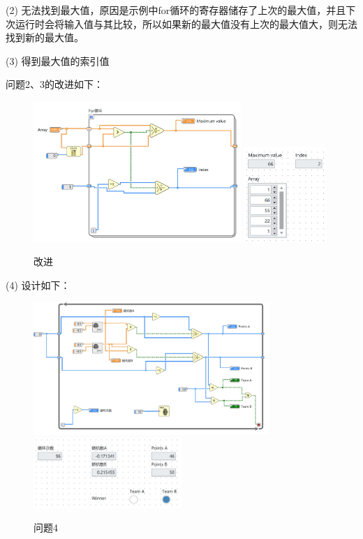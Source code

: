 \documentclass{../source/Experiment}
\begin{document}
        (2) 无法找到最大值，原因是示例中for循环的寄存器储存了上次的最大值，并且下次运行时会将输入值与其比较，所以如果新的最大值没有上次的最大值大，则无法找到新的最大值。

        (3) 得到最大值的索引值
    
        问题2、3的改进如下：
        \begin{figure}[H]
            \centering
            \includegraphics[width = 0.7\textwidth]{lab8/lab1-问题3-3-a.jpg}
            \includegraphics[width = 0.28\textwidth]{lab8/lab1-问题3-3-b.jpg}
            \caption{改进}
        \end{figure}

        (4)
        设计如下：
        
        \begin{figure}[H]
            \centering
            \includegraphics[width = 0.8\textwidth]{lab8/lab1-AB得分-a.jpg}
            \includegraphics[width = 0.5\textwidth]{lab8/lab1-AB得分-b.jpg}
            \caption{问题4}
        \end{figure}

        
\end{document}

